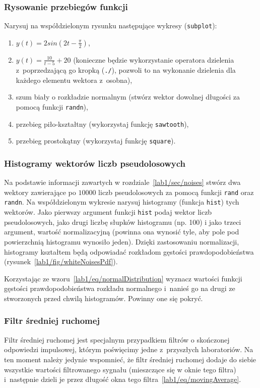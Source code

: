 \subsubsection{Rysowanie przebiegów funkcji}
Narysuj na współdzielonym rysunku następujące wykresy (\texttt{subplot}):
\begin{enumerate}
	\item $y(t) = 2sin(2t - \frac{\pi}{2})$,
	\item $y(t) = \frac{10}{t-5} + 20$ (konieczne będzie wykorzystanie operatora dzielenia z~poprzedzającą go kropką (\texttt{./}), pozwoli to na wykonanie dzielenia dla każdego elementu wektora z~osobna),
	\item szum biały o rozkładzie normalnym (stwórz wektor dowolnej długości za pomocą funkcji \texttt{randn}),
	\item przebieg piło-kształtny (wykorzystaj funkcję \texttt{sawtooth}),
	\item przebieg prostokątny (wykorzystaj funkcję \texttt{square}).
\end{enumerate}

\subsubsection{Histogramy wektorów liczb pseudolosowych}
Na podstawie informacji zawartych w rozdziale~\ref{lab1/sec/noises} stwórz dwa wektory zawierające po $10000$ liczb pseudolosowych za pomocą funkcji \texttt{rand} oraz \texttt{randn}. Na współdzielonym wykresie narysuj histogramy (funkcja \texttt{hist}) tych wektorów. Jako pierwszy argument funkcji \texttt{hist} podaj wektor liczb pseudolosowych, jako drugi liczbę słupków histogramu (np. 100) i jako trzeci argument, wartość normalizacyjną (powinna ona wynosić tyle, aby pole pod powierzchnią histogramu wynosiło jeden). Dzięki zastosowaniu normalizacji, histogramy kształtem będą odpowiadać rozkładom gęstości prawdopodobieństwa (rysunek~\ref{lab1/fig/whiteNoisesPdf}). 

 
Korzystając ze wzoru~\ref{lab1/eq/normalDistribution} wyznacz wartości funkcji gęstości prawdopodobieństwa rozkładu normalnego i~nanieś go na drugi ze stworzonych przed chwilą histogramów. Powinny one się pokryć. 

\subsubsection{Filtr średniej ruchomej}
Filtr średniej ruchomej jest specjalnym przypadkiem filtrów o skończonej odpowiedzi impulsowej, którym poświęcimy jedne z~przyszłych laboratoriów. Na ten moment należy jedynie wspomnieć, że filtr średniej ruchomej dodaje do siebie wszystkie wartości filtrowanego sygnału (mieszczące się w oknie tego filtra) i~następnie dzieli je przez długość okna tego filtra~\ref{lab1/eq/movingAverage}.

